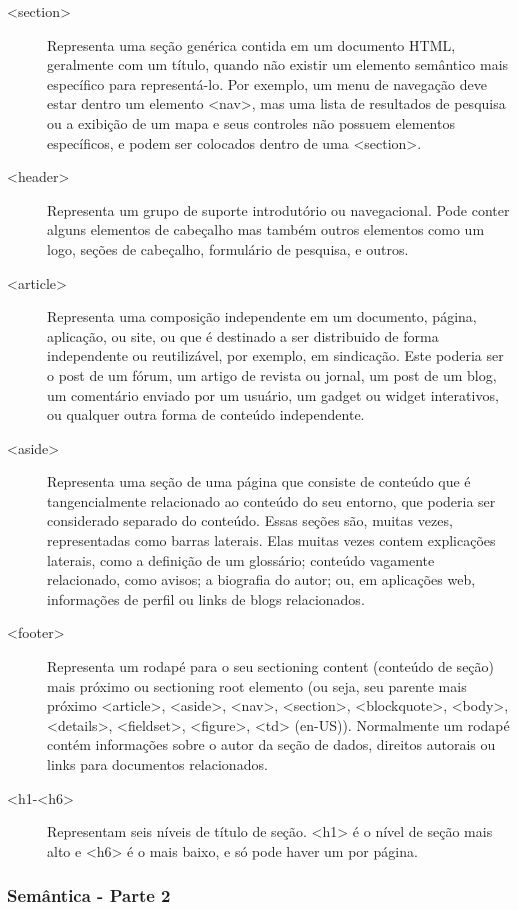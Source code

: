\documentclass[12pt,a4paper]{article}
\begin{document}
	\begin{description}
		\item[<section>] Representa uma seção genérica contida em um documento HTML, geralmente com um título, quando não existir um elemento semântico mais específico para representá-lo. Por exemplo, um menu de navegação deve estar dentro um elemento <nav>, mas uma lista de resultados de pesquisa ou a exibição de um mapa e seus controles não possuem elementos específicos, e podem ser colocados dentro de uma <section>. 
		\item[<header>] Representa um grupo de suporte introdutório ou navegacional. Pode conter alguns elementos de cabeçalho mas também outros elementos como um logo, seções de cabeçalho, formulário de pesquisa, e outros.
		\item[<article>] Representa uma composição independente em um documento, página, aplicação, ou site, ou que é destinado a ser distribuido de forma independente ou reutilizável, por exemplo, em sindicação. Este poderia ser o post de um fórum, um artigo de revista ou jornal, um post de um blog, um comentário enviado por um usuário, um gadget ou widget interativos, ou qualquer outra forma de conteúdo independente.
		\item[<aside>]  Representa uma seção de uma página que consiste de conteúdo que é tangencialmente relacionado ao conteúdo do seu entorno, que poderia ser considerado separado do conteúdo. Essas seções são, muitas vezes, representadas como barras laterais. Elas muitas vezes contem explicações laterais, como a definição de um glossário; conteúdo vagamente relacionado, como avisos; a biografia do autor; ou, em aplicações web, informações de perfil ou links de blogs relacionados.
		\item[<footer>] Representa um rodapé para o seu sectioning content (conteúdo de seção) mais próximo ou sectioning root elemento (ou seja, seu parente mais próximo <article>, <aside>, <nav>, <section>, <blockquote>, <body>, <details>, <fieldset>, <figure>, <td> (en-US)). Normalmente um rodapé contém informações sobre o autor da seção de dados, direitos autorais ou links para documentos relacionados.
		\item[<h1-<h6>] Representam seis níveis de título de seção. <h1> é o nível de seção mais alto e <h6> é o mais baixo, e só pode haver um por página.		
	\end{description}
	
	\subsubsection{Semântica - Parte 2}
	
\end{document}

